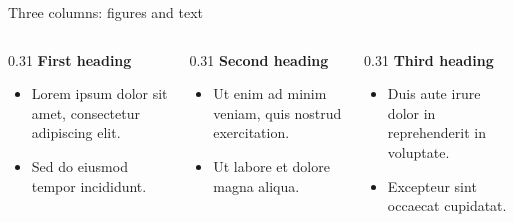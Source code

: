 \begin{frame}[t]{Three columns: figures and text}
    \begin{columns}[T,onlytextwidth]
        \begin{column}{0.31\textwidth}
            \textbf{First heading}\par\medskip
            \begin{itemize}
                \item Lorem ipsum dolor sit amet, consectetur adipiscing elit.
                \item Sed do eiusmod tempor incididunt.
            \end{itemize}
        \end{column}
        \begin{column}{0.31\textwidth}
            \textbf{Second heading}\par\medskip
            \begin{itemize}
                \item Ut enim ad minim veniam, quis nostrud exercitation.
                \item Ut labore et dolore magna aliqua.
            \end{itemize}
        \end{column}
        \begin{column}{0.31\textwidth}
            \textbf{Third heading}\par\medskip
            \begin{itemize}
                \item Duis aute irure dolor in reprehenderit in voluptate.
                \item Excepteur sint occaecat cupidatat.
            \end{itemize}
        \end{column}
    \end{columns}
\end{frame}

